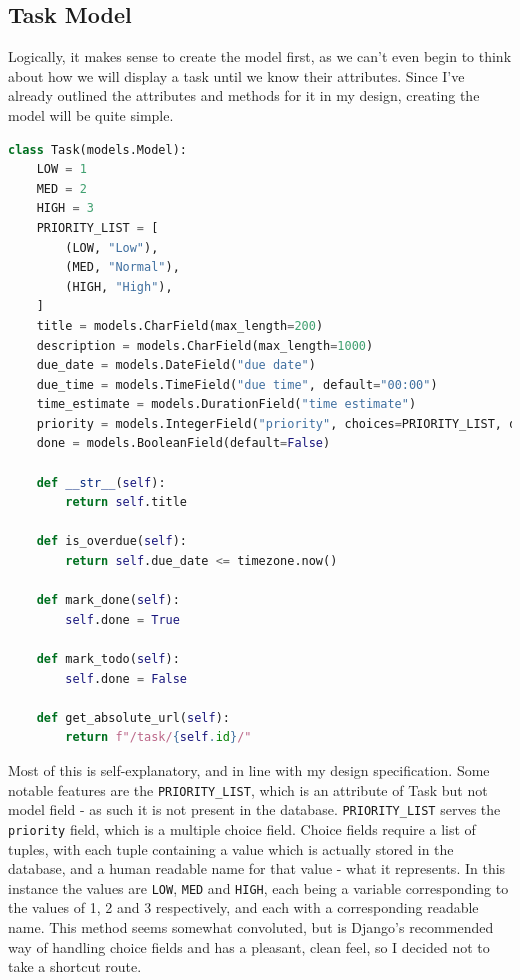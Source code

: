 \documentclass{article}
\begin{document}
\subsection{Task Model}
Logically, it makes sense to create the model first,
as we can't even begin to think about how we will display a task until we know their attributes.
Since I've already outlined the attributes and methods for it in my design,
creating the model will be quite simple.

\begin{lstlisting}[language=Python, breaklines]
class Task(models.Model):
    LOW = 1
    MED = 2
    HIGH = 3
    PRIORITY_LIST = [
        (LOW, "Low"),
        (MED, "Normal"),
        (HIGH, "High"),
    ]
    title = models.CharField(max_length=200)
    description = models.CharField(max_length=1000)
    due_date = models.DateField("due date")
    due_time = models.TimeField("due time", default="00:00")
    time_estimate = models.DurationField("time estimate")
    priority = models.IntegerField("priority", choices=PRIORITY_LIST, default=2)
    done = models.BooleanField(default=False)

    def __str__(self):
        return self.title

    def is_overdue(self):
        return self.due_date <= timezone.now()

    def mark_done(self):
        self.done = True

    def mark_todo(self):
        self.done = False

    def get_absolute_url(self):
        return f"/task/{self.id}/"
\end{lstlisting}

Most of this is self-explanatory, and in line with my design specification.
Some notable features are the \texttt{PRIORITY\_LIST},
which is an attribute of Task but not model field -
as such it is not present in the database.
\texttt{PRIORITY\_LIST} serves the \texttt{priority} field,
which is a multiple choice field.
Choice fields require a list of tuples,
with each tuple containing a value which is actually stored in the database,
and a human readable name for that value - what it represents.
In this instance the values are \texttt{LOW}, \texttt{MED} and \texttt{HIGH},
each being a variable corresponding to the values of 1, 2 and 3 respectively,
and each with a corresponding readable name.
This method seems somewhat convoluted,
but is Django's recommended way of handling choice fields and has a pleasant, clean feel,
so I decided not to take a shortcut route.
\end{document}
